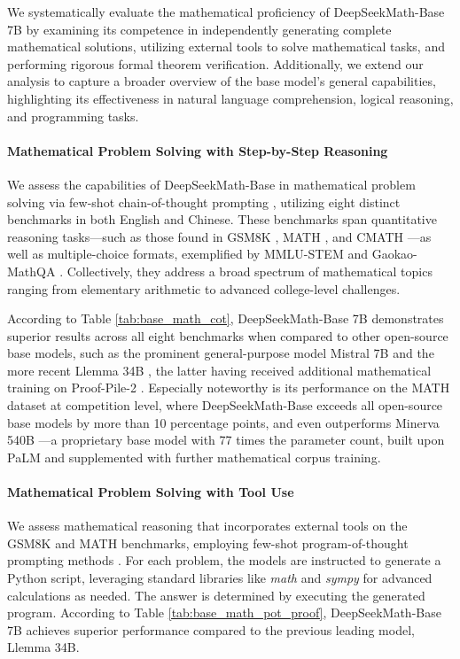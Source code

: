 \begin{itemize}[topsep=0pt]
We systematically evaluate the mathematical proficiency of DeepSeekMath-Base 7B by examining its competence in independently generating complete mathematical solutions, utilizing external tools to solve mathematical tasks, and performing rigorous formal theorem verification. Additionally, we extend our analysis to capture a broader overview of the base model’s general capabilities, highlighting its effectiveness in natural language comprehension, logical reasoning, and programming tasks.

\paragraph{Mathematical Problem Solving with Step-by-Step Reasoning}

We assess the capabilities of DeepSeekMath-Base in mathematical problem solving via few-shot chain-of-thought prompting \citep{cot}, utilizing eight distinct benchmarks in both English and Chinese. These benchmarks span quantitative reasoning tasks—such as those found in GSM8K \citep{gsm8k}, MATH \citep{MATH}, and CMATH \citep{wei2023cmath}—as well as multiple-choice formats, exemplified by MMLU-STEM \citep{mmlu} and Gaokao-MathQA \citep{agieval}. Collectively, they address a broad spectrum of mathematical topics ranging from elementary arithmetic to advanced college-level challenges.

According to Table \ref{tab:base_math_cot}, DeepSeekMath-Base 7B demonstrates superior results across all eight benchmarks when compared to other open-source base models, such as the prominent general-purpose model Mistral 7B \citep{mistral} and the more recent Llemma 34B \citep{llemma}, the latter having received additional mathematical training on Proof-Pile-2 \citep{llemma}. Especially noteworthy is its performance on the MATH dataset at competition level, where DeepSeekMath-Base exceeds all open-source base models by more than 10 percentage points, and even outperforms Minerva 540B \citep{minerva}—a proprietary base model with 77 times the parameter count, built upon PaLM \citep{palm} and supplemented with further mathematical corpus training.

\paragraph{Mathematical Problem Solving with Tool Use} We assess mathematical reasoning that incorporates external tools on the GSM8K and MATH benchmarks, employing few-shot program-of-thought prompting methods \citep{pot,pal}. For each problem, the models are instructed to generate a Python script, leveraging standard libraries like \textit{math} and \textit{sympy} for advanced calculations as needed. The answer is determined by executing the generated program. According to Table \ref{tab:base_math_pot_proof}, DeepSeekMath-Base 7B achieves superior performance compared to the previous leading model, Llemma 34B.


\end{itemize}
